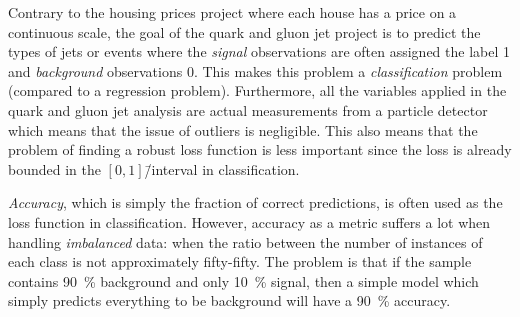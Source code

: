 Contrary to the housing prices project where each house has a price on a continuous scale, the goal of the quark and gluon jet project is to predict the types of jets or events where the \emph{signal} observations are often assigned the label \num{1} and \emph{background} observations \num{0}. 
This makes this problem a \emph{classification} problem (compared to a regression problem). Furthermore, all the variables applied in the quark and gluon jet analysis are actual measurements from a particle detector which means that the issue of outliers is negligible. This also means that the problem of finding a robust loss function is less important since the loss is already bounded in the $[0, 1]$\=/interval in classification.

\emph{Accuracy}, which is simply the fraction of correct predictions, is often used as the loss function in classification. However, accuracy as a metric suffers a lot when handling \emph{imbalanced} data: when the ratio between the number of instances of each class is not approximately fifty-fifty. The problem is that if the sample contains \SI{90}{\percent} background and only \SI{10}{\percent} signal, then a simple model which simply predicts everything to be background will have a \SI{90}{\percent} accuracy.

